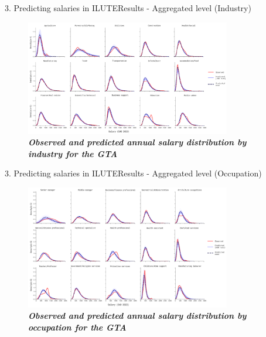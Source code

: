 \documentclass[aspectratio=169]{beamer}
\begin{document}
\begin{frame}{3. Predicting salaries in ILUTE}{Results - Aggregated level (Industry)}
    \vspace*{-23pt}
    \begin{figure}
        \centering
        \includegraphics[width=0.80\textwidth]{./images/salary_ind.png}
        \captionsetup{labelformat=empty}
        \setlength{\abovecaptionskip}{-2pt} %
        \caption{\fontsize{8pt}{8pt}\selectfont \textbf{\textit{Observed and predicted annual salary distribution by industry for the GTA}}}
    \end{figure}
\end{frame}

\begin{frame}{3. Predicting salaries in ILUTE}{Results - Aggregated level (Occupation)}
    \vspace*{-23pt}
    \begin{figure}
        \centering
        \includegraphics[width=0.80\textwidth]{./images/salary_occ.png}
        \captionsetup{labelformat=empty}
        \setlength{\abovecaptionskip}{-2pt} %
        \caption{\fontsize{8pt}{8pt}\selectfont \textbf{\textit{Observed and predicted annual salary distribution by occupation for the GTA}}}
    \end{figure}
\end{frame}
\end{document}

